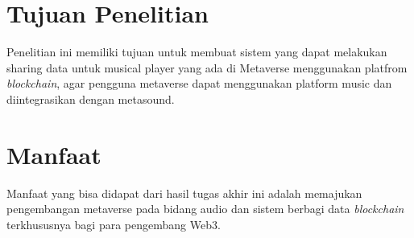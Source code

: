\section{Tujuan Penelitian}

Penelitian ini memiliki tujuan untuk membuat sistem yang
dapat melakukan sharing data untuk musical player yang ada
di Metaverse menggunakan platfrom \emph{blockchain}, agar
pengguna metaverse dapat menggunakan platform music
dan diintegrasikan dengan metasound.

\section{Manfaat}
Manfaat yang bisa didapat dari hasil tugas akhir ini adalah
memajukan pengembangan metaverse pada bidang audio dan sistem berbagi data \emph{blockchain}
terkhususnya bagi para pengembang Web3.
